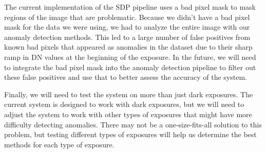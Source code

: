 The current implementation of the SDP pipeline uses a bad pixel mask to mask regions of the image that are problematic. 
Because we didn't have a bad pixel mask for the data we were using, we had to analyze the entire image with our anomaly detection methods.
This led to a large number of false positives from known bad pixels that appeared as anomalies in the dataset due to their sharp ramp in DN values at the beginning of the exposure.
In the future, we will need to integrate the bad pixel mask into the anomaly detection pipeline to filter out these false positives and use that to better assess the accuracy of the system. 

Finally, we will need to test the system on more than just dark exposures.
The current system is designed to work with dark exposures, but we will need to adjust the system to work with other types of exposures that might have more difficulty detecting anomalies.
There may not be a one-size-fits-all solution to this problem, but testing different types of exposures will help us determine the best methods for each type of exposure.